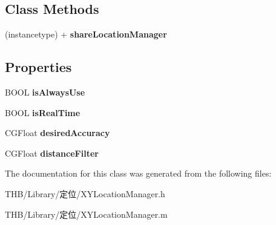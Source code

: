 \subsection*{Class Methods}
\begin{DoxyCompactItemize}
\item 
\mbox{\label{interface_x_y_location_manager_a943904044c80ef7b53666cd3808874fa}} 
(instancetype) + {\bfseries share\+Location\+Manager}
\end{DoxyCompactItemize}
\subsection*{Properties}
\begin{DoxyCompactItemize}
\item 
\mbox{\label{interface_x_y_location_manager_ab3dbf4fb29dd33f7340db6c0b0976a57}} 
B\+O\+OL {\bfseries is\+Always\+Use}
\item 
\mbox{\label{interface_x_y_location_manager_a271a457073a7dfb078ad3103d7dc47f2}} 
B\+O\+OL {\bfseries is\+Real\+Time}
\item 
\mbox{\label{interface_x_y_location_manager_afd94b6331330ca252903277e52ce381a}} 
C\+G\+Float {\bfseries desired\+Accuracy}
\item 
\mbox{\label{interface_x_y_location_manager_a8d81045ffd2e8a6dda001c30093b72ca}} 
C\+G\+Float {\bfseries distance\+Filter}
\end{DoxyCompactItemize}


The documentation for this class was generated from the following files\+:\begin{DoxyCompactItemize}
\item 
T\+H\+B/\+Library/定位/X\+Y\+Location\+Manager.\+h\item 
T\+H\+B/\+Library/定位/X\+Y\+Location\+Manager.\+m\end{DoxyCompactItemize}
